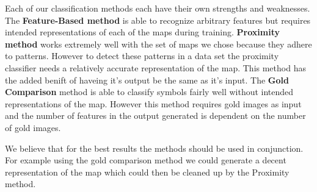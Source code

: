 Each of our classification methods each have their own strengths and
weaknesses.  The \textbf{Feature-Based method} is able to recognize arbitrary
features but requires intended representations of each of the maps during
training. \textbf{Proximity method} works extremely well with the set of maps
we chose because they adhere to patterns. However to detect these patterns in a
data set the proximity classifier needs a relatively accurate representation of
the map. This method has the added benift of haveing it's output be the same as
it's input.  The \textbf{Gold Comparison} method is able to classify symbols
fairly well without intended representations of the map. However this method
requires gold images as input and the number of features in the output
generated is dependent on the number of gold images.

We believe that for the best results the methods should be used in conjunction.
For example using the gold comparison method we could generate a decent
representation of the map which could then be cleaned up by the Proximity
method.
